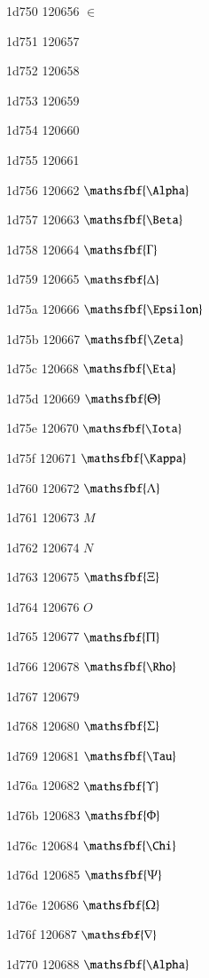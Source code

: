 \documentclass[11pt]{article}
\begin{document}
1d750 120656 \ensuremath{\in}

1d751 120657 \mathbit{\vartheta}

1d752 120658 \mathbit{\varkappa}

1d753 120659 \mathbit{\phi}

1d754 120660 \mathbit{\varrho}

1d755 120661 \mathbit{\varpi}

1d756 120662 \ensuremath{\mathsfbf{\Alpha}}

1d757 120663 \ensuremath{\mathsfbf{\Beta}}

1d758 120664 \ensuremath{\mathsfbf{\Gamma}}

1d759 120665 \ensuremath{\mathsfbf{\Delta}}

1d75a 120666 \ensuremath{\mathsfbf{\Epsilon}}

1d75b 120667 \ensuremath{\mathsfbf{\Zeta}}

1d75c 120668 \ensuremath{\mathsfbf{\Eta}}

1d75d 120669 \ensuremath{\mathsfbf{\Theta}}

1d75e 120670 \ensuremath{\mathsfbf{\Iota}}

1d75f 120671 \ensuremath{\mathsfbf{\Kappa}}

1d760 120672 \ensuremath{\mathsfbf{\Lambda}}

1d761 120673 \ensuremath{M}

1d762 120674 \ensuremath{N}

1d763 120675 \ensuremath{\mathsfbf{\Xi}}

1d764 120676 \ensuremath{O}

1d765 120677 \ensuremath{\mathsfbf{\Pi}}

1d766 120678 \ensuremath{\mathsfbf{\Rho}}

1d767 120679 \mathsfbf{\vartheta}

1d768 120680 \ensuremath{\mathsfbf{\Sigma}}

1d769 120681 \ensuremath{\mathsfbf{\Tau}}

1d76a 120682 \ensuremath{\mathsfbf{\Upsilon}}

1d76b 120683 \ensuremath{\mathsfbf{\Phi}}

1d76c 120684 \ensuremath{\mathsfbf{\Chi}}

1d76d 120685 \ensuremath{\mathsfbf{\Psi}}

1d76e 120686 \ensuremath{\mathsfbf{\Omega}}

1d76f 120687 \ensuremath{\mathsfbf{\nabla}}

1d770 120688 \ensuremath{\mathsfbf{\Alpha}}
\end{document}
